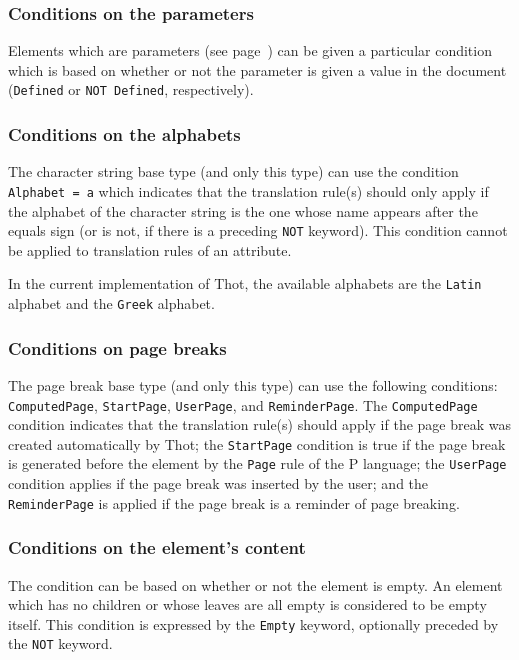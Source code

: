 \subsubsection{Conditions on the parameters}

Elements which are parameters (see page~\pageref{param}) can be given
a particular condition which is based on whether or not the parameter
is given a value in the document ({\tt Defined} or {\tt NOT Defined},
respectively). 

\subsubsection{Conditions on the alphabets}

The character string base type (and only this type) can use the
condition {\tt Alphabet = a} which indicates that the translation
rule(s) should only apply if the alphabet of the character string is
the one whose name appears after the equals sign (or is not, if there
is a preceding {\tt NOT} keyword).  This condition cannot be applied
to translation rules of an attribute.

In the current implementation of Thot, the available alphabets are the
{\tt Latin} alphabet and the {\tt Greek} alphabet.

\subsubsection{Conditions on page breaks}

The page break base type (and only this type) can use the following
conditions:\\
{\tt ComputedPage}, {\tt StartPage}, {\tt UserPage}, and
{\tt ReminderPage}.  The {\tt ComputedPage} condition indicates that
the translation rule(s) should apply if the page break was created
automatically by Thot;  the {\tt StartPage} condition is true if the
page break is generated before the element by the {\tt Page} rule of
the P language; the {\tt UserPage} condition applies if the page break
was inserted by the user; and the {\tt ReminderPage} is applied if the
page break is a reminder of page breaking.

\subsubsection{Conditions on the element's content}

The condition can be based on whether or not the element is empty.  An
element which has no children or whose leaves are all empty is
considered to be empty itself.  This condition is expressed by the
{\tt Empty} keyword, optionally preceded by the {\tt NOT} keyword.

